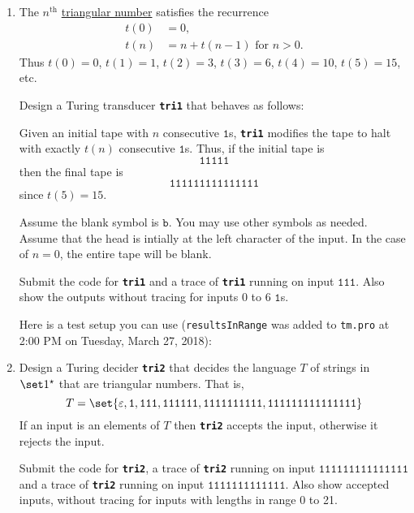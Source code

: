 \documentclass{cs81-homework}
\begin{document}
\begin{enumerate}
\item {} The \(n^\text{th}\) \underline{triangular number} satisfies
  the recurrence
  \begin{align*}
    t(0) &= 0, \\
    t(n) &= n + t(n-1) \text{ for } n > 0.
  \end{align*}
  Thus \(t(0) = 0\), \(t(1) = 1\), \(t(2) = 3\), \(t(3) = 6\), \(t(4) = 10\),
  \(t(5) = 15\), etc.

  Design a Turing transducer \textbf{\texttt{tri1}} that behaves as follows:

  Given an initial tape with \(n\) consecutive \(\mathtt 1\)s,
  \textbf{\texttt{tri1}} modifies the tape to halt with exactly \(t(n)\)
  consecutive \(\mathtt 1\)s.  Thus, if the initial tape is
  \[
    \mathtt{11111}
  \]
  then the final tape is
  \[
    \mathtt{111111111111111}
  \]
  since \(t(5) = 15\).

  Assume the blank symbol is \(\mathtt b\).  You may use other symbols as
  needed.  Assume that the head is intially at the left character of the input.
  In the case of \(n=0\), the entire tape will be blank.

  Submit the code for \textbf{\texttt{tri1}} and a trace of
  \textbf{\texttt{tri1}} running on input \(\mathtt{111}\).  Also show the
  outputs without tracing for inputs 0 to 6 \(\mathtt 1\)s.

  Here is a test setup you can use (\texttt{resultsInRange} was added to
  \texttt{tm.pro} at 2:00 PM on Tuesday, March 27, 2018):
  
  

  \begin{solution}
  \end{solution}

\item {} Design a Turing decider \textbf{\texttt{tri2}} that decides
  the language \(T\) of strings in \(\set 1^\star\) that are triangular numbers.
  That is,
  \[
    T = \set{\varepsilon, \mathtt 1, \mathtt{111}, \mathtt{111111},
      \mathtt{1111111111}, \mathtt{111111111111111}}
  \]
  If an input is an elements of \(T\) then \textbf{\texttt{tri2}} accepts the
  input, otherwise it rejects the input.

  Submit the code for \textbf{\texttt{tri2}}, a trace of \textbf{\texttt{tri2}}
  running on input \(\mathtt{111111111111111}\) and a trace of
  \textbf{\texttt{tri2}} running on input \(\mathtt{1111111111111}\).  Also show
  accepted inputs, without tracing for inputs with lengths in range 0 to 21.


\end{enumerate}
\end{document}
